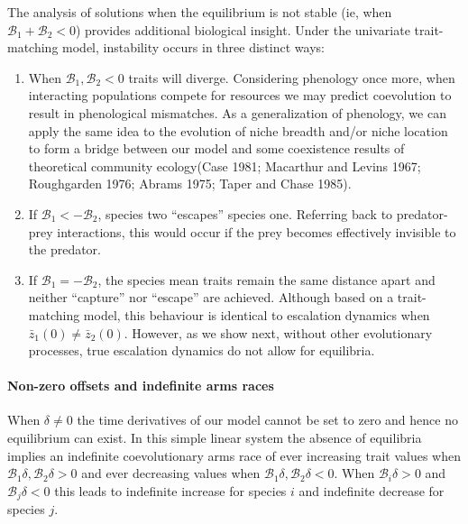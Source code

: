 \documentclass[]{article}
\let\oldparagraph\paragraph
\renewcommand{\paragraph}[1]{\oldparagraph{#1}\mbox{}}
\begin{document}
The analysis of solutions when the equilibrium is not stable (ie, when
\(\mathscr{B}_1+\mathscr{B}_2<0\)) provides additional biological
insight. Under the univariate trait-matching model, instability occurs
in three distinct ways:

\begin{enumerate}
\def\labelenumi{\arabic{enumi})}
\item
  When \(\mathscr{B}_1,\mathscr{B}_2<0\) traits will diverge.
  Considering phenology once more, when interacting populations compete
  for resources we may predict coevolution to result in phenological
  mismatches. As a generalization of phenology, we can apply the same
  idea to the evolution of niche breadth and/or niche location to form a
  bridge between our model and some coexistence results of theoretical
  community ecology(Case 1981; Macarthur and Levins 1967; Roughgarden
  1976; Abrams 1975; Taper and Chase 1985).
\item
  If \(\mathscr{B}_1<-\mathscr{B}_2\), species two ``escapes'' species
  one. Referring back to predator-prey interactions, this would occur if
  the prey becomes effectively invisible to the predator.
\item
  If \(\mathscr{B}_1=-\mathscr{B}_2\), the species mean traits remain
  the same distance apart and neither ``capture'' nor ``escape'' are
  achieved. Although based on a trait-matching model, this behaviour is
  identical to escalation dynamics when \(\bar z_1(0)\neq\bar z_2(0)\).
  However, as we show next, without other evolutionary processes, true
  escalation dynamics do not allow for equilibria.
\end{enumerate}

\hypertarget{non-zero-offsets-and-indefinite-arms-races}{%
\paragraph{Non-zero offsets and indefinite arms
races}\label{non-zero-offsets-and-indefinite-arms-races}}

When \(\delta\neq0\) the time derivatives of our model cannot be set to
zero and hence no equilibrium can exist. In this simple linear system
the absence of equilibria implies an indefinite coevolutionary arms race
of ever increasing trait values when
\(\mathscr{B}_1\delta,\mathscr{B}_2\delta>0\) and ever decreasing values
when \(\mathscr{B}_1\delta,\mathscr{B}_2\delta<0\). When
\(\mathscr{B}_i\delta>0\) and \(\mathscr{B}_j\delta<0\) this leads to
indefinite increase for species \(i\) and indefinite decrease for
species \(j\).
\end{document}
